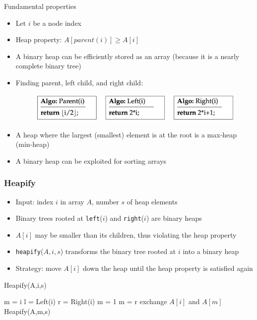 Fundamental properties
\begin{itemize}
    \item Let $i$ be a node index
    \item Heap property: $A[parent(i)]\geq A[i]$
    \item A binary heap can be efficiently stored as an array (because it is a nearly complete binary tree)
    \item Finding parent, left child, and right child:
    \begin{figure}[H]
        \centering
        \includegraphics[width=0.5\linewidth]{images/Screenshot 2024-05-30 at 15.13.23.jpg}
    \end{figure}
    \item A heap where the largest (smallest) element is at the root is a max-heap (min-heap)
    \item A binary heap can be exploited for sorting arrays
\end{itemize}

\subsubsection{Heapify}
\begin{itemize}
    \item Input: index $i$ in array $A$, number $s$ of heap elements
    \item Binary trees rooted at \texttt{left}($i$) and \texttt{right}($i$) are binary heaps
    \item $A[i]$ may be smaller than its children, thus violating the heap property
    \item \texttt{heapify}($A,i,s$) transforms the binary tree rooted at $i$ into a binary heap
    \item Strategy: move $A[i]$ down the heap until the heap property is satisfied again
\end{itemize}

\begin{center}
\begin{minipage}{0.6\textwidth} %
\centering %
\begin{algorithm}[H]
\caption{Heapify(A,i,s)}
m = i\;
l = Left(i)\;
r = Right(i)\;
 {
m = 1\;
}
 {
m = r\;
}
 {
exchange $A[i]$ and $A[m]$\;
Heapify(A,m,s)\;
}
\end{algorithm}
\end{minipage}
\end{center}

